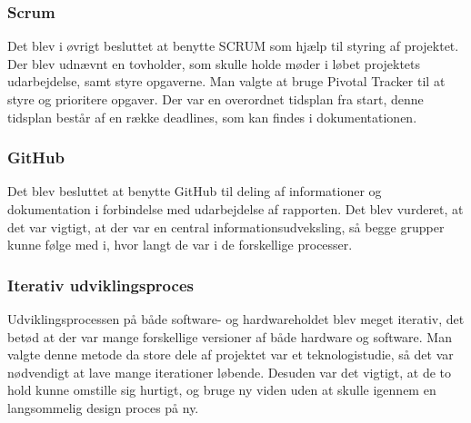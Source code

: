 \subsubsection{Scrum}
Det blev i øvrigt besluttet at benytte SCRUM som hjælp til styring af projektet. Der blev udnævnt en tovholder, som skulle holde møder i løbet projektets udarbejdelse, samt styre opgaverne. Man valgte at bruge Pivotal Tracker \cite{tracker}  til at styre og prioritere opgaver. Der var en overordnet tidsplan fra start, denne tidsplan består af en række deadlines, som kan findes i dokumentationen.
\subsubsection{GitHub}
Det blev besluttet at benytte GitHub til deling af informationer og dokumentation i forbindelse med udarbejdelse af rapporten. Det blev vurderet, at det var vigtigt, at der var en central informationsudveksling, så begge grupper kunne følge med i, hvor langt de var i de forskellige processer. 
\subsubsection{Iterativ udviklingsproces}
Udviklingsprocessen på både software- og hardwareholdet blev meget iterativ, det betød at der var mange forskellige versioner af både hardware og software. Man valgte denne metode da store dele af projektet var et teknologistudie, så det var nødvendigt at lave mange iterationer løbende. Desuden var det vigtigt, at de to hold kunne omstille sig hurtigt, og bruge ny viden uden at skulle igennem en langsommelig design proces på ny.
